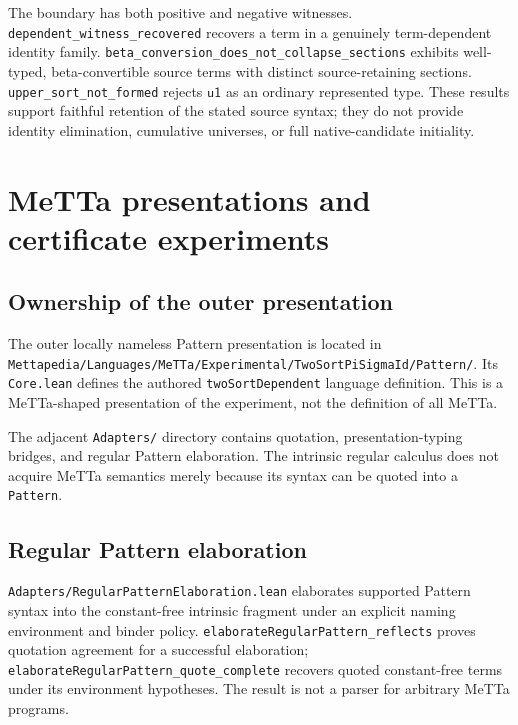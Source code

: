 \documentclass[11pt]{article}
\newcommand{\code}[1]{\nolinkurl{#1}}
\newcommand{\uO}{\mathsf{u1}}
\begin{document}
The boundary has both positive and negative witnesses.
\code{dependent_witness_recovered} recovers a term in a genuinely
term-dependent identity family.
\code{beta_conversion_does_not_collapse_sections} exhibits well-typed,
beta-convertible source terms with distinct source-retaining sections.
\code{upper_sort_not_formed} rejects $\uO$ as an ordinary represented type.
These results support faithful retention of the stated source syntax;
they do not provide identity elimination, cumulative universes, or full
native-candidate initiality.

\section{MeTTa presentations and certificate experiments}
\label{sec:adapters}

\subsection{Ownership of the outer presentation}

The outer locally nameless Pattern presentation is located in
\code{Mettapedia/Languages/MeTTa/Experimental/TwoSortPiSigmaId/Pattern/}.
Its \code{Core.lean} defines the authored
\code{twoSortDependent} language definition. This is a MeTTa-shaped
presentation of the experiment, not the definition of all MeTTa.

The adjacent \code{Adapters/} directory contains quotation,
presentation-typing bridges, and regular Pattern elaboration.
The intrinsic regular calculus does not acquire MeTTa semantics merely
because its syntax can be quoted into a \code{Pattern}.

\subsection{Regular Pattern elaboration}

\code{Adapters/RegularPatternElaboration.lean} elaborates supported Pattern
syntax into the constant-free intrinsic fragment under an explicit naming
environment and binder policy.
\code{elaborateRegularPattern_reflects} proves quotation agreement for a
successful elaboration; \code{elaborateRegularPattern_quote_complete}
recovers quoted constant-free terms under its environment hypotheses.
The result is not a parser for arbitrary MeTTa programs.
\end{document}
